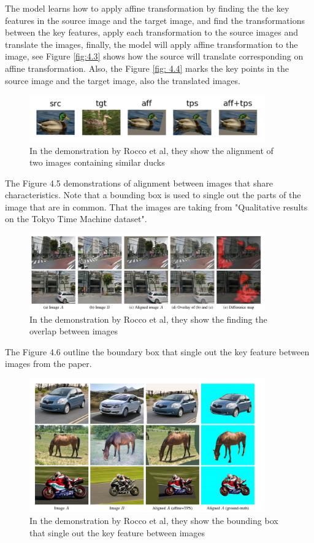  The model learns how to apply affine transformation by finding the the key features in the source image and the target image, and find the transformations between the key features, apply each transformation to the source images and translate the images, finally, the model will apply affine transformation to the image, see Figure \ref{fig:4.3} shows how the source will translate corresponding on affine transformation. Also, the Figure \ref{fig: 4.4} marks the key points in the source image and the target image, also the translated images.\\ 
\begin{figure}
\centering
\includegraphics[width = 4.0in]{figs/aff_tps}
\caption{In the demonstration by Rocco et al\cite{Rocco17}, they show the alignment of two images containing similar ducks}
\end{figure}
The Figure 4.5 demonstrations of alignment between images that share characteristics. Note that a bounding box is used to single out the parts of the image that are in common. That the images are taking from "Qualitative results on the Tokyo Time Machine dataset\citep{Rocco18}".\\
\begin{figure}
\centering
\includegraphics[width = 4.0in]{figs/overlap}
\caption{In the demonstration by Rocco et al\cite{Rocco18}, they show the finding the overlap between images}
\end{figure}
  The Figure 4.6 outline the boundary box that single out the key feature between images from the paper\citep{Rocco17}.
\begin{figure}
\centering
\includegraphics[width = 4.0in]{figs/bound_box}
\caption{In the demonstration by Rocco et al\cite{Rocco18}, they show the bounding box that single out the key feature between images}
\end{figure}
 

